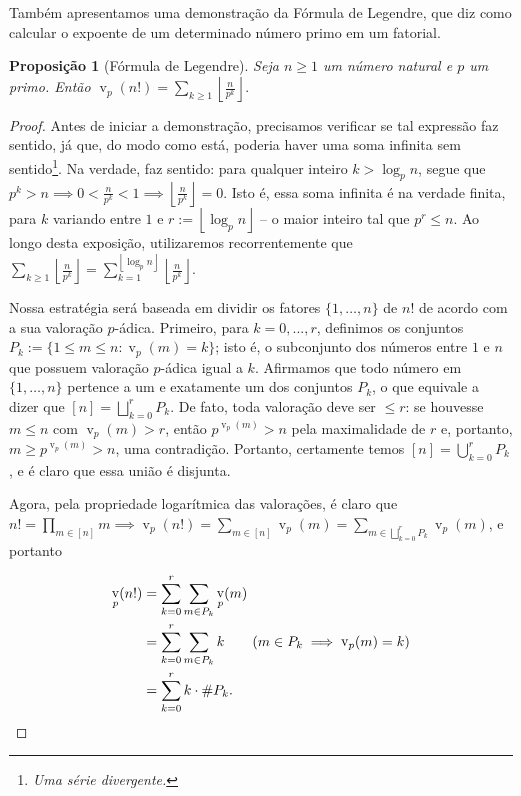 \documentclass[11pt]{article}
\newtheorem{proposition}[theorem]{Proposição}
\theoremstyle{remark}
\newcommand{\floor}[1]{\left\lfloor #1 \right\rfloor}
\newcommand{\vs}{\vspace{10px}}
\DeclareMathOperator{\val}{v}
\DeclareMathOperator{\vv}{v}
\begin{document}
Também apresentamos uma demonstração da Fórmula de Legendre, que diz como calcular o expoente de um determinado número primo em um fatorial.

\begin{proposition}[Fórmula de Legendre] \label{prop:legendres_formula}
    Seja $n\ge 1$ um número natural e $p$ um primo. Então $\val_p(n!) =\sum\limits_{k\ge 1}\left\lfloor \frac{n}{p^k}\right \rfloor.$
\end{proposition}
\vs
\begin{proof}
    Antes de iniciar a demonstração, precisamos verificar se tal expressão faz sentido, já que, do modo como está, poderia haver uma soma infinita sem sentido\footnote{\textit{Uma série divergente.}}. Na verdade, faz sentido: para qualquer inteiro $k> \log_p n$, segue que $p^k > n\implies0< \frac{n}{p^k}<1\implies \floor{\frac{n}{p^k}}=0$. Isto é, essa soma infinita é na verdade finita, para $k$ variando entre $1$ e $r:=\floor{\log_p n}$ -- o maior inteiro tal que $p^r \le n$. Ao longo desta exposição, utilizaremos recorrentemente que $\sum\limits_{k\ge 1}\left\lfloor \frac{n}{p^k}\right \rfloor = \sum\limits_{k=1}^{\floor{\log_p n}}\left\lfloor \frac{n}{p^k}\right \rfloor.$ 
    \vs

    Nossa estratégia será baseada em dividir os fatores $\{1,\ldots, n\}$ de $n!$ de acordo com a sua valoração $p$-ádica. Primeiro, para $k=0, ..., r$, definimos os conjuntos $P_k:= \{1\le m\le n: \vv_p(m) = k\}$; isto é, o subconjunto dos números entre $1$ e $n$ que possuem valoração $p$-ádica igual a $k$. Afirmamos que todo número em $\{1,\ldots, n\}$ pertence a um e exatamente um dos conjuntos $P_k$, o que equivale a dizer que $[n]= \bigsqcup\limits_{k=0}^rP_k$. De fato, toda valoração deve ser $\le r$: se houvesse $m\le n$ com $\val_p(m)> r$, então $p^{\val_p(m)}>n$ pela maximalidade de $r$ e, portanto, $m\ge p^{\val_p(m)}>n$, uma contradição. Portanto, certamente temos $[n]=\bigcup\limits_{k=0}^r P_k$, e é claro que essa união é disjunta.

    Agora, pela propriedade logarítmica das valorações, é claro que $n! = \prod\limits_{m\in [n]}m\implies \val_p(n!) = \sum\limits_{m\in [n]}\val_p(m)=\sum\limits_{m\in \bigsqcup_{k=0}^rP_k} \val_p(m)$, e portanto 
    
    \begin{align*}
        \val_p(n!)&=\sum\limits_{k=0}^r\sum\limits_{m\in P_k}\val_p(m) \\
        &= \sum_{k=0}^r\sum_{m\in P_k}k \tag*{($m\in P_k\implies \val_p(m)=k$)}\\
        &= \sum_{k=0}^r k\cdot \#P_k.
    \end{align*}
    \vs
    

\end{proof}
\end{document}
